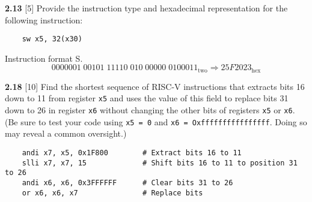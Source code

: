 \documentclass[fleqn]{article}
\begin{document}
\pagebreak

\textbf{2.13} [5] \textrangle \; Provide the instruction type and hexadecimal representation for the following instruction:
\begin{lstlisting}
    sw x5, 32(x30)
\end{lstlisting}
\vspace{0.25in}
Instruction format S.
\[0000001 \; 00101 \; 11110 \; 010  \; 00000 \; 0100011_{\text{two}} \Rightarrow 25F2023_{\text{hex}} \]

\vspace{0.5in}


\textbf{2.18} [10] \textrangle \; Find the shortest sequence of RISC-V instructions that extracts bits 16 down to 11 from register \verb|x5| and uses the value of this field to replace bits 31 down to 26 in register \verb|x6| without changing the other bits of registers \verb|x5| or \verb|x6|. (Be sure to test your code using \verb|x5 = 0| and \verb|x6 = Oxffffffffffffffff|. Doing so may reveal a common oversight.)
\begin{lstlisting}
    andi x7, x5, 0x1F800        # Extract bits 16 to 11
    slli x7, x7, 15             # Shift bits 16 to 11 to position 31 to 26 
    andi x6, x6, 0x3FFFFFF      # Clear bits 31 to 26 
    or x6, x6, x7               # Replace bits
\end{lstlisting}
\end{document}
